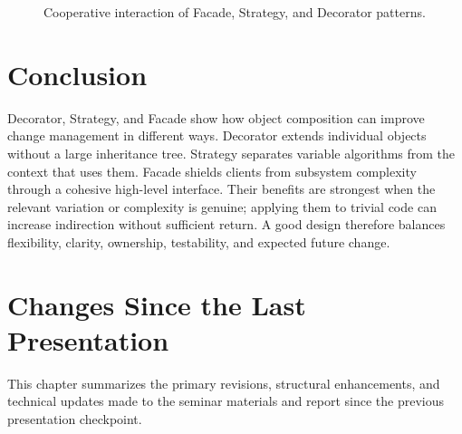 \documentclass[11pt,a4paper]{report}
\begin{document}
\begin{figure}[htbp]
  \centering
  \caption{Cooperative interaction of Facade, Strategy, and Decorator patterns.}\label{fig:combined-patterns}
\end{figure}

\chapter{Conclusion}
Decorator, Strategy, and Facade show how object composition can improve change
management in different ways. Decorator extends individual objects without a
large inheritance tree. Strategy separates variable algorithms from the context
that uses them. Facade shields clients from subsystem complexity through a
cohesive high-level interface. Their benefits are strongest when the relevant
variation or complexity is genuine; applying them to trivial code can increase
indirection without sufficient return. A good design therefore balances
flexibility, clarity, ownership, testability, and expected future change.

\appendix
\chapter{Changes Since the Last Presentation}
This chapter summarizes the primary revisions, structural enhancements, and technical updates made to the seminar materials and report since the previous presentation checkpoint.
\end{document}
